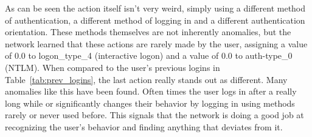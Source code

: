 As can be seen the action itself isn't very weird, simply using a different method of authentication, a different method of logging in and a different authentication orientation. These methods themselves are not inherently anomalies, but the network learned that these actions are rarely made by the user, assigning a value of 0.0 to logon_type_4 (interactive logon) and a value of 0.0 to auth-type_0 (NTLM). When compared to the user's previous logins in Table~\ref{tab:prev_logins}, the last action really stands out as different. Many anomalies like this have been found. Often times the user logs in after a really long while or significantly changes their behavior by logging in using methods rarely or never used before. This signals that the network is doing a good job at recognizing the user's behavior and finding anything that deviates from it.